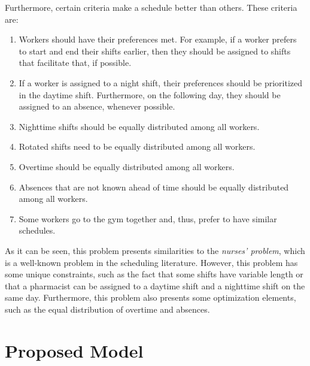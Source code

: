 \documentclass[conference]{IEEEtran}
\begin{document}
Furthermore, certain criteria make a schedule better than others. These criteria are:

\begin{enumerate}[resume]
    \item {
        \label{criterion:worker-preferences}
        Workers should have their preferences met. For example, if a worker prefers to start and end their shifts earlier, then they should be assigned to shifts that facilitate that, if possible.
    }
    \item {
        \label{criterion:nighttime-workers-prioritzation}
        If a worker is assigned to a night shift, their preferences should be prioritized in the daytime shift. Furthermore, on the following day, they should be assigned to an absence, whenever possible.
    }
    \item {
        \label{criterion:night-shifts-distribution}
        Nighttime shifts should be equally distributed among all workers.
    }
    \item {
        \label{criterion:rotated-shifts-distribution}
        Rotated shifts need to be equally distributed among all workers.
    }
    \item {
        \label{criterion:overtime-distribution}
        Overtime should be equally distributed among all workers.
    }
    \item {
        \label{criterion:absences-distribution}
        Absences that are not known ahead of time should be equally distributed among all workers.
    }
    \item {
        \label{criterion:worker-groups}
        Some workers go to the gym together and, thus, prefer to have similar schedules.
    }
\end{enumerate}

As it can be seen, this problem presents similarities to the \textit{nurses' problem}, which is a well-known problem in the scheduling literature. However, this problem has some unique constraints, such as the fact that some shifts have variable length or that a pharmacist can be assigned to a daytime shift and a nighttime shift on the same day. Furthermore, this problem also presents some optimization elements, such as the equal distribution of overtime and absences.

\section{Proposed Model}
\label{section:proposed-model}
\end{document}

